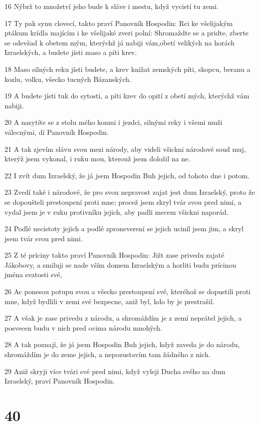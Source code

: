 \par 16 Nýbrž to množství jeho bude k sláve i mestu, když vycistí tu zemi.
\par 17 Ty pak synu clovecí, takto praví Panovník Hospodin: Rci ke všelijakým ptákum krídla majícím i ke všelijaké zveri polní: Shromaždte se a pridte, zberte se odevšad k obetem mým, kterýchž já nabiji vám,obetí velikých na horách Izraelských, a budete jísti maso a píti krev.
\par 18 Maso silných reku jísti budete, a krev knížat zemských píti, skopcu, beranu a kozlu, volku, všecko tucných Bázanských.
\par 19 A budete jísti tuk do sytosti, a píti krev do opití z obetí mých, kterýchž vám nabiji.
\par 20 A nasytíte se z stolu mého konmi i jezdci, silnými reky i všemi muži válecnými, dí Panovník Hospodin.
\par 21 A tak zjevím slávu svou mezi národy, aby videli všickni národové soud muj, kterýž jsem vykonal, i ruku mou, kterouž jsem doložil na ne.
\par 22 I zvít dum Izraelský, že já jsem Hospodin Buh jejich, od tohoto dne i potom.
\par 23 Zvedí také i národové, že pro svou nepravost zajat jest dum Izraelský, proto že se dopoušteli prestoupení proti mne; procež jsem skryl tvár svou pred nimi, a vydal jsem je v ruku protivníku jejich, aby padli mecem všickni naporád.
\par 24 Podlé necistoty jejich a podlé zproneverení se jejich ucinil jsem jim, a skryl jsem tvár svou pred nimi.
\par 25 Z té príciny takto praví Panovník Hospodin: Jižt zase privedu zajaté Jákobovy, a smiluji se nade vším domem Izraelským a horliti budu prícinou jména svatosti své,
\par 26 Ac ponesou potupu svou a všecko prestoupení své, kteréhož se dopustili proti mne, když bydlili v zemi své bezpecne, aniž byl, kdo by je prestrašil.
\par 27 A však je zase privedu z národu, a shromáždím je z zemí neprátel jejich, a posvecen budu v nich pred ocima národu mnohých.
\par 28 A tak poznají, že já jsem Hospodin Buh jejich, když zaveda je do národu, shromáždím je do zeme jejich, a nepozustavím tam žádného z nich.
\par 29 Aniž skryji více tvári své pred nimi, když vyleji Ducha svého na dum Izraelský, praví Panovník Hospodin.

\chapter{40}

